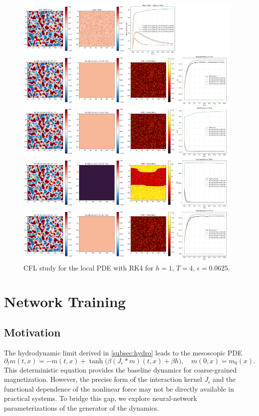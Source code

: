 \documentclass[11pt,a4paper]{article}
\begin{document}
\begin{figure}[!h]
    \centering
    \includegraphics[width=1.0\textwidth]{fig/pde_cfl_study_poly_h=1_T=4_eps=0.0625_L=1024.png}
    \caption{CFL study for the local PDE with RK4 for $h=1$, $T=4$, $\epsilon=0.0625$.}
    \label{fig:pde_cfl_study_h1_T4_eps0.0625}
\end{figure}



\section{Network Training}
\label{sec:network}

\subsection{Motivation}
The hydrodynamic limit derived in \cref{subsec:hydro} leads to the mesoscopic PDE
\begin{equation}
\partial_t m(t,x) = -m(t,x) + \tanh\!\big(\beta (J_\epsilon \ast m)(t,x) + \beta h \big),
\quad m(0,x) = m_0(x).
\label{eq:hydro}
\end{equation}
This deterministic equation provides the baseline dynamics for coarse-grained magnetization.
However, the precise form of the interaction kernel $J_\epsilon$ and the functional dependence of
the nonlinear force may not be directly available in practical systems. 
To bridge this gap, we explore neural-network parameterizations of the generator of the dynamics.
\end{document}
